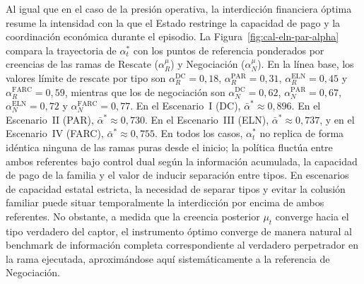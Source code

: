 \documentclass[review,authoryear,12pt]{elsarticle}
\theoremstyle{plain}
\theoremstyle{definition}
\newcommand{\1}{\mathbf{1}}
\begin{document}
Al igual que en el caso de la presión operativa, la interdicción financiera óptima resume la intensidad con la que el Estado restringe la capacidad de pago y la coordinación económica durante el episodio. La Figura~\ref{fig:cal-eln-par-alpha} compara la trayectoria de $\alpha_t^\ast$ con los puntos de referencia ponderados por creencias de las ramas de Rescate ($\alpha_R^\mu$) y Negociación ($\alpha_N^\mu$). En la línea base, los valores límite de rescate por tipo son $\alpha_R^{\mathrm{DC}}=0{,}18$, $\alpha_R^{\mathrm{PAR}}=0{,}31$, $\alpha_R^{\mathrm{ELN}}=0{,}45$ y $\alpha_R^{\mathrm{FARC}}=0{,}59$, mientras que los de negociación son $\alpha_N^{\mathrm{DC}}=0{,}62$, $\alpha_N^{\mathrm{PAR}}=0{,}67$, $\alpha_N^{\mathrm{ELN}}=0{,}72$ y $\alpha_N^{\mathrm{FARC}}=0{,}77$. En el Escenario~I (DC), $\bar\alpha^\ast\approx 0{,}896$. En el Escenario~II (PAR), $\bar\alpha^\ast\approx 0{,}730$. En el Escenario~III (ELN), $\bar\alpha^\ast\approx 0{,}737$, y en el Escenario~IV (FARC), $\bar\alpha^\ast\approx 0{,}755$. En todos los casos, $\alpha_t^\ast$ no replica de forma idéntica ninguna de las ramas puras desde el inicio; la política fluctúa entre ambos referentes bajo control dual según la información acumulada, la capacidad de pago de la familia y el valor de inducir separación entre tipos. En escenarios de capacidad estatal estricta, la necesidad de separar tipos y evitar la colusión familiar puede situar temporalmente la interdicción por encima de ambos referentes. No obstante, a medida que la creencia posterior $\mu_t$ converge hacia el tipo verdadero del captor, el instrumento óptimo converge de manera natural al benchmark de información completa correspondiente al verdadero perpetrador en la rama ejecutada, aproximándose aquí sistemáticamente a la referencia de Negociación.
\end{document}
